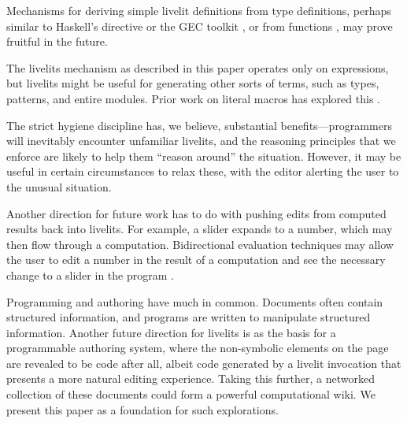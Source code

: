 Mechanisms for deriving simple 
livelit definitions from type definitions, perhaps similar to Haskell's  directive
or the GEC toolkit \cite{DBLP:conf/afp/AchtenEPW04}, or from  functions \cite{DBLP:conf/vl/HempelC20}, 
may prove fruitful in the future.

  The livelits mechanism as described in this paper operates only on expressions,
  but livelits might be useful for generating other sorts of terms, such as types,
  patterns, and entire modules. Prior work on literal macros has explored this \cite{TLMs}.

   The strict hygiene discipline has, we believe, substantial 
   benefits---programmers will inevitably encounter unfamiliar livelits, and 
   the reasoning principles that we enforce are likely to help them ``reason around''
   the situation. However, it may be useful in certain circumstances to 
   relax these, with the editor alerting the user to the unusual situation.

  Another direction for future work has to do with pushing edits from computed results
  back into livelits. For example, a slider expands to a number, which may 
  then flow through a computation. Bidirectional evaluation techniques may allow
  the user to edit a number in the result of a computation and see the necessary
  change to a slider in the program \cite{sns-pldi,sns-uist}.

  Programming and authoring have much in common. Documents often contain structured
  information, and programs are written to manipulate structured information.
  Another future direction for livelits is as the basis for a programmable authoring 
  system, where the non-symbolic elements on the page are revealed to be code after all,
  albeit code generated by a livelit invocation that presents a more natural editing experience. 
  Taking this further, a networked collection of these
  documents could form a powerful computational wiki.
  We present this paper as a foundation for such explorations.


